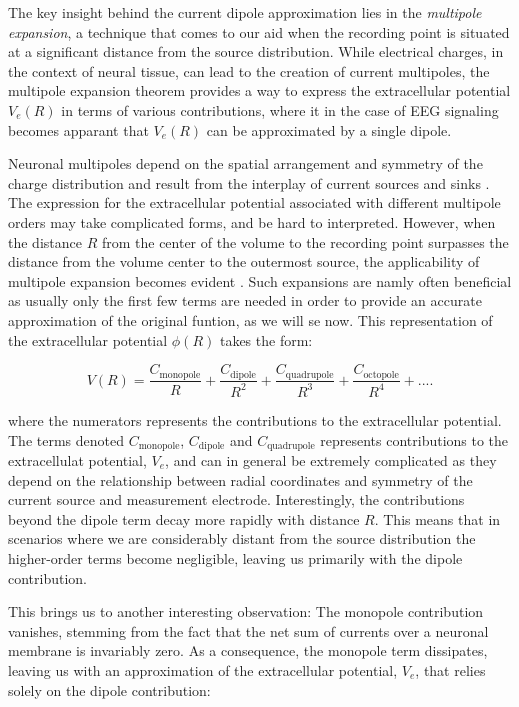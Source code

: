 \documentclass[a4paper, UKenglish, 11pt]{uiomaster}
\begin{document}
The key insight behind the current dipole approximation lies in the \emph{multipole expansion}, a technique that comes to our aid when the recording point is situated at a significant distance from the source distribution. While electrical charges, in the context of neural tissue, can lead to the creation of current multipoles, the multipole expansion theorem provides a way to express the extracellular potential $V_e(R)$ in terms of various contributions, where it in the case of EEG signaling becomes apparant that $V_e(R)$ can be approximated by a single dipole.

Neuronal multipoles depend on the spatial arrangement and symmetry of the charge distribution and result from the interplay of current sources and sinks \cite{wiki:multipoles}. The expression for the extracellular potential associated with different multipole orders may take complicated forms, and be hard to interpreted. However, when the distance $R$ from the center of the volume to the recording point surpasses the distance from the volume center to the outermost source, the applicability of multipole expansion becomes evident \cite{jackson1999classical}. Such expansions are namly often beneficial as usually only the first few terms are needed in order to provide an accurate approximation of the original funtion, as we will se now. This representation of the extracellular potential $\phi(R)$ takes the form:

\begin{equation}
  V(R) = \frac{C_{\text{monopole}}}{R} + \frac{C_{\text{dipole}}}{R^2} + \frac{C_{\text{quadrupole}}}{R^3} + \frac{C_{\text{octopole}}}{R^4} + ... .
\label{eq:extracellular_potential}
\end{equation}

where the numerators represents the contributions to the extracellular potential. The terms denoted $C_\text{monopole}$, $C_\text{dipole}$ and $C_\text{quadrupole}$ represents contributions to the extracellulat potential, $V_e$, and can in general be extremely complicated as they depend on the relationship between radial coordinates and symmetry of the current source and measurement electrode. Interestingly, the contributions beyond the dipole term decay more rapidly with distance $R$. This means that in scenarios where we are considerably distant from the source distribution the higher-order terms become negligible, leaving us primarily with the dipole contribution.

This brings us to another interesting observation: The monopole contribution vanishes, stemming from the fact that the net sum of currents over a neuronal membrane is invariably zero. As a consequence, the monopole term dissipates, leaving us with an approximation of the extracellular potential, $V_e$, that relies solely on the dipole contribution:
\end{document}
